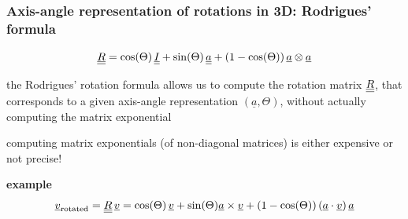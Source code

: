 \begin{frame}
  \frametitle{Axis-angle representation of rotations in 3D: Rodrigues' formula}
  
  \begin{displaymath}
    \underline{\underline{R}} = \cos(\Theta) \, \underline{\underline{I}} + \sin(\Theta) \, \underline{\underline{a}} + (1-\cos(\Theta)) \, \underline{a} \otimes \underline{a}
  \end{displaymath}
 
  \vspace{1em}
  the Rodrigues' rotation formula allows us to compute the rotation matrix $\underline{\underline{R}}$,\newline
  that corresponds to a given axis-angle representation $\left( \underline{a}, \Theta \right)$, \newline
  without actually computing the matrix exponential
  
  \vspace{1em}
  computing matrix exponentials (of non-diagonal matrices) is either expensive or not precise!
  
  \vspace{2em}
  \textbf{example}
  \begin{displaymath}
    \underline{v}_{\text{rotated}} = \underline{\underline{R}} \, \underline{v} = \cos(\Theta) \, \underline{v} + \sin(\Theta) \underline{a} \times \underline{v} + (1-\cos(\Theta)) \, (\underline{a} \cdot \underline{v}) \,\underline{a}
  \end{displaymath}
  
\end{frame}


